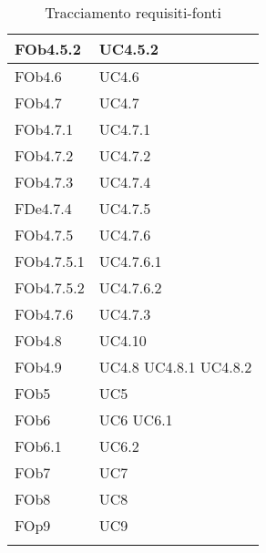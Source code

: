 \begin{longtable}{|l|p{4cm}|}
\hline
FOb4.5.2 & UC4.5.2 \linebreak  \\ 
\hline
FOb4.6 & UC4.6 \linebreak  \\ 
\hline
FOb4.7 & UC4.7 \linebreak  \\ 
\hline
FOb4.7.1 & UC4.7.1 \linebreak  \\ 
\hline
FOb4.7.2 & UC4.7.2 \linebreak  \\ 
\hline
FOb4.7.3 & UC4.7.4 \linebreak  \\ 
\hline
FDe4.7.4 & UC4.7.5 \linebreak  \\ 
\hline
FOb4.7.5 & UC4.7.6 \linebreak  \\ 
\hline
FOb4.7.5.1 & UC4.7.6.1 \linebreak  \\ 
\hline
FOb4.7.5.2 & UC4.7.6.2 \linebreak  \\ 
\hline
FOb4.7.6 & UC4.7.3 \linebreak  \\ 
\hline
FOb4.8 & UC4.10 \linebreak  \\ 
\hline
FOb4.9 & UC4.8 \linebreak  UC4.8.1 \linebreak  UC4.8.2 \linebreak  \\ 
\hline
FOb5 & UC5 \linebreak \\ 
\hline
FOb6 & UC6 \linebreak UC6.1 \linebreak \\ 
\hline
FOb6.1 & UC6.2 \linebreak  \\ 
\hline
FOb7 & UC7 \linebreak \\ 
\hline
FOb8 & UC8 \linebreak \\ 
\hline
FOp9 & UC9 \linebreak \\ 
\hline
\caption{Tracciamento requisiti-fonti}
\end{longtable}
	
